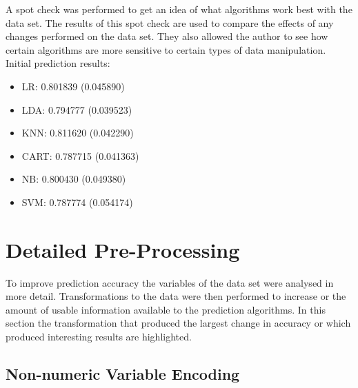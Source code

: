 \documentclass{article}
\begin{document}
A spot check was performed to get an idea of what algorithms work best with the data set. The results of this spot check are used to compare the effects of any changes performed on the data set. They also allowed the author to see how certain algorithms are more sensitive to certain types of data manipulation.
\linebreak
Initial prediction results:

\begin{itemize}
\item LR: 0.801839 (0.045890)
\item LDA: 0.794777 (0.039523)
\item KNN: 0.811620 (0.042290)
\item CART: 0.787715 (0.041363)
\item NB: 0.800430 (0.049380)
\item SVM: 0.787774 (0.054174)
\end{itemize}

\newpage
\section{Detailed Pre-Processing}

To improve prediction accuracy the variables of the data set were analysed in more detail. Transformations to the data were then performed to increase or the amount of usable information available to the prediction algorithms. In this section the transformation that produced the largest change in accuracy or which produced interesting results are highlighted.

\subsection{Non-numeric Variable Encoding}
\end{document}

